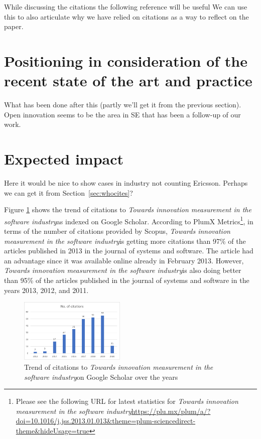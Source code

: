 \documentclass[sigplan]{acmart}
\newcommand{\theArticle}{\textit{Towards innovation measurement in the software industry}}
\begin{document}
While discussing the citations the following reference will be useful \cite{penders2018ten} We can use this to also articulate why we have relied on citations as a way to reflect on the paper.


\section{Positioning in consideration of the recent state of the art and practice}\label{sec:soa} 
What has been done after this (partly we'll get it from the previous section).
Open innovation seems to be the area in SE that has been a follow-up of our work.

\section{Expected impact}\label{sec:impact}
Here it would be nice to show cases in industry not counting Ericsson. Perhaps we can get it from Section~\ref{sec:whocites}?

Figure \ref{fig:citationTrend} shows the trend of citations to \theArticle as indexed on Google Scholar. According to PlumX Metrics\footnote{Please see the following URL for latest statistics for \theArticle \url{https://plu.mx/plum/a/?doi=10.1016/j.jss.2013.01.013&theme=plum-sciencedirect-theme&hideUsage=true}}, in terms of the number of citations provided by Scopus, \theArticle is getting more citations than 97\% of the articles published in 2013 in the journal of systems and software. The article had an advantage since it was available online already in February 2013. However, \theArticle is also doing better than 95\% of the articles published in the journal of systems and software in the years 2013, 2012, and 2011.

\begin{figure}[htbp]
	\begin{center}
		\includegraphics[width=0.45\textwidth,height=\textheight,keepaspectratio]{Figures/CitationsTrend.pdf}
	\end{center}
	\caption{Trend of citations to \theArticle on Google Scholar over the years}
	\label{fig:citationTrend}
\end{figure}
\end{document}
